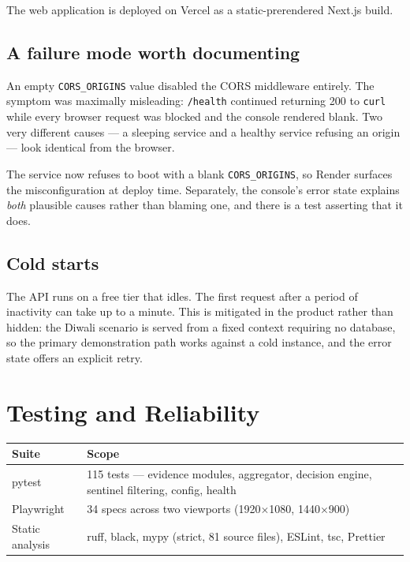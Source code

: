 \documentclass[11pt,a4paper]{article}
\newcommand{\code}[1]{\texttt{\small #1}}
\begin{document}
The web application is deployed on Vercel as a static-prerendered Next.js build.

\subsection{A failure mode worth documenting}

An empty \code{CORS\_ORIGINS} value disabled the CORS middleware entirely. The
symptom was maximally misleading: \code{/health} continued returning 200 to
\code{curl} while every browser request was blocked and the console rendered blank.
Two very different causes --- a sleeping service and a healthy service refusing an
origin --- look identical from the browser.

The service now refuses to boot with a blank \code{CORS\_ORIGINS}, so Render
surfaces the misconfiguration at deploy time. Separately, the console's error state
explains \emph{both} plausible causes rather than blaming one, and there is a test
asserting that it does.

\subsection{Cold starts}

The API runs on a free tier that idles. The first request after a period of
inactivity can take up to a minute. This is mitigated in the product rather than
hidden: the Diwali scenario is served from a fixed context requiring no database, so
the primary demonstration path works against a cold instance, and the error state
offers an explicit retry.

\section{Testing and Reliability}

\begin{center}
\small
\begin{tabular}{@{}l l@{}}
\toprule
\textbf{Suite} & \textbf{Scope} \\
\midrule
pytest & 115 tests --- evidence modules, aggregator, decision engine, sentinel
filtering, config, health \\
Playwright & 34 specs across two viewports (1920$\times$1080, 1440$\times$900) \\
Static analysis & ruff, black, mypy (strict, 81 source files), ESLint, tsc, Prettier \\
\bottomrule
\end{tabular}
\end{center}
\end{document}
